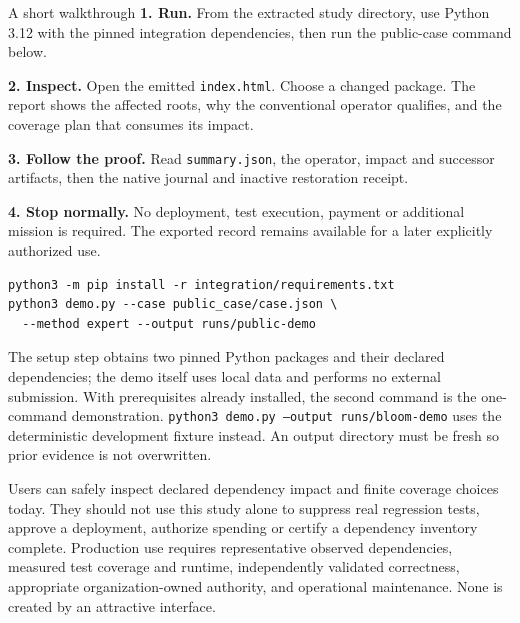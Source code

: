 \documentclass[11pt,letterpaper]{article}
\begin{document}
\begin{evidencebox}{A short walkthrough}
\textbf{1. Run.} From the extracted study directory, use Python 3.12 with the pinned integration dependencies, then run the public-case command below.\par
\textbf{2. Inspect.} Open the emitted \texttt{index.html}. Choose a changed package. The report shows the affected roots, why the conventional operator qualifies, and the coverage plan that consumes its impact.\par
\textbf{3. Follow the proof.} Read \texttt{summary.json}, the operator, impact and successor artifacts, then the native journal and inactive restoration receipt.\par
\textbf{4. Stop normally.} No deployment, test execution, payment or additional mission is required. The exported record remains available for a later explicitly authorized use.
\end{evidencebox}
\begin{verbatim}
python3 -m pip install -r integration/requirements.txt
python3 demo.py --case public_case/case.json \
  --method expert --output runs/public-demo
\end{verbatim}
The setup step obtains two pinned Python packages and their declared dependencies; the demo itself uses local data and performs no external submission. With prerequisites already installed, the second command is the one-command demonstration. \texttt{python3 demo.py --output runs/bloom-demo} uses the deterministic development fixture instead. An output directory must be fresh so prior evidence is not overwritten.

Users can safely inspect declared dependency impact and finite coverage choices today. They should not use this study alone to suppress real regression tests, approve a deployment, authorize spending or certify a dependency inventory complete. Production use requires representative observed dependencies, measured test coverage and runtime, independently validated correctness, appropriate organization-owned authority, and operational maintenance. None is created by an attractive interface.

\FloatBarrier
\end{document}
